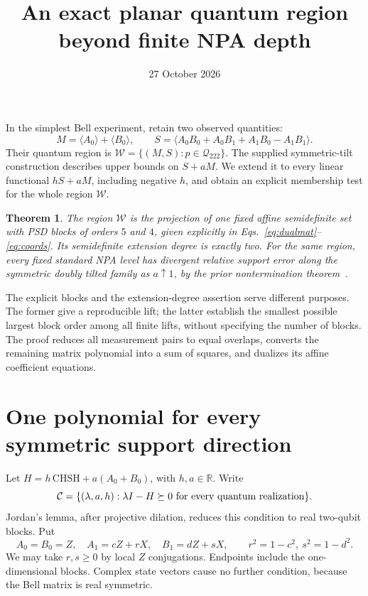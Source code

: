 \documentclass[11pt]{article}
\title{An exact planar quantum region beyond finite NPA depth}
\author{}
\date{27 October 2026}
\newtheorem{theorem}{Theorem}
\newcommand{\Q}{\mathcal Q}
\newcommand{\W}{\mathcal W}
\begin{document}
\maketitle
\vspace{-2em}

In the simplest Bell experiment, retain two observed quantities:
\[
 M=\langle A_0\rangle+\langle B_0\rangle,\qquad
 S=\langle A_0B_0+A_0B_1+A_1B_0-A_1B_1\rangle .
\]
Their quantum region is
\(\W=\{(M,S):p\in\Q_{222}\}\).
The supplied symmetric-tilt construction describes upper bounds on \(S+aM\).
We extend it to every linear functional \(hS+aM\), including negative \(h\),
and obtain an explicit membership test for the whole region \(\W\).

\begin{theorem}
The region \(\W\) is the projection of one fixed affine semidefinite set with
PSD blocks of orders \(5\) and \(4\), given explicitly in
Eqs.~\eqref{eq:dualmat}--\eqref{eq:coords}.
Its semidefinite extension degree is exactly two.
For the same region, every fixed standard NPA level has divergent relative
support error along the symmetric doubly tilted family as \(a\uparrow1\),
by the prior nontermination theorem~\cite{prior}.
\end{theorem}

The explicit blocks and the extension-degree assertion serve different purposes.
The former give a reproducible lift; the latter establish the smallest possible
largest block order among all finite lifts, without specifying the number of blocks.
The proof reduces all measurement pairs to equal overlaps, converts the remaining
matrix polynomial into a sum of squares, and dualizes its affine coefficient equations.

\section{One polynomial for every symmetric support direction}

Let \(H=h\,\mathrm{CHSH}+a(A_0+B_0)\), with \(h,a\in\mathbb R\).
Write
\[
 {\cal C}=\{(\lambda,a,h):\lambda I-H\succeq0
 \text{ for every quantum realization}\}.
\]
Jordan's lemma, after projective dilation, reduces this condition to real
two-qubit blocks. Put
\[
 A_0=B_0=Z,\quad A_1=cZ+rX,\quad B_1=dZ+sX,\qquad
 r^2=1-c^2,\ s^2=1-d^2 .
\]
We may take \(r,s\ge0\) by local \(Z\) conjugations. Endpoints include the
one-dimensional blocks. Complex state vectors cause no further condition,
because the Bell matrix is real symmetric.
\end{document}
